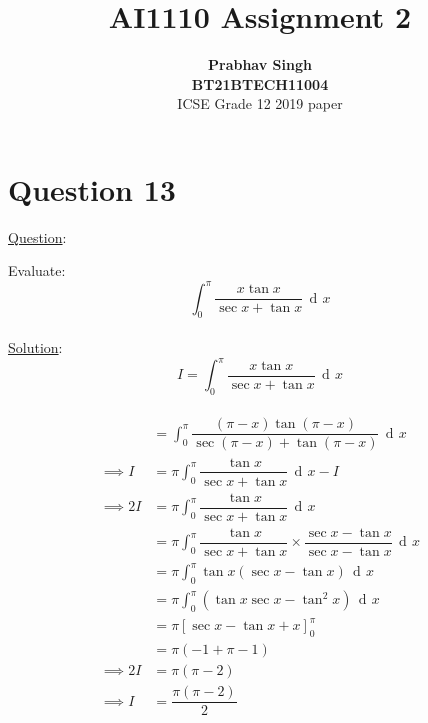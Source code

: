 \documentclass[journal,12pt,twocolumn]{IEEEtran}
\DeclareMathOperator{\di}{d\!}
\begin{document}
	\title{\textbf{AI1110 Assignment 2} }
	\author{\textbf{Prabhav Singh}\\\textbf{BT21BTECH11004}\\ ICSE Grade 12 2019 paper}
	\maketitle
	
	{\section*{Question 13}}
	
	{\large \underline{Question}:\newline}
	
	Evaluate:
	\begin{equation}
		\int_{0}^{{\pi}} \dfrac{x \tan x}{\sec x + \tan x } \,\di x 
	\end{equation}\\
	
	{\large \underline{Solution}:}\\
	 	\begin{equation}
	 I=	\int_{0}^{{\pi}} \dfrac{x \tan x}{\sec x + \tan x } \,\di x 
	 \end{equation}\\
                \begin{align}
	                &=	\int_{0}^{{\pi}} \dfrac{({\pi-x})\tan({\pi-x})}{\sec({\pi-x})  + \tan ({\pi-x}) } \,\di x   \\
	\implies I 	&= {\pi}\int_{0}^{{\pi}} \dfrac{\tan x}{\sec x  + \tan x } \,\di x  -I \\
	\implies 2I	&=  {\pi}\int_{0}^{{\pi}} \dfrac{\tan x}{\sec x  + \tan x } \,\di x \\
	        	&=  {\pi}\int_{0}^{{\pi}} \dfrac{\tan x}{\sec x  + \tan x } \times\dfrac{\sec x -\tan x}{\sec x -\tan x}\,\di x  \\
	        	&= {\pi}\int_{0}^{{\pi}} \tan x(\sec x-\tan x)\,\di x\\
	        	&=  {\pi}\int_{0}^{{\pi}}( \tan x\sec x-\tan^2 x)\,\di x\\
	        	&={\pi} \left[\sec x -\tan x +x \right]^{\pi}_{0}\\
	        	&= {\pi}(-1+{\pi}-1)\\
	\implies 2I     &={\pi}({\pi}-2) \\
	\implies I      &= \dfrac{{\pi}({\pi}-2)}{2}      	
		\end{align}
	
\end{document}
